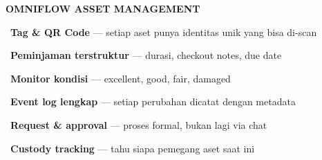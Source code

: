 \documentclass[a4paper]{article}
\begin{document}
\begin{minipage}[t]{0.485\textwidth}
    \colorbox{TealPrimary}{%
        \begin{minipage}{\dimexpr\textwidth-14pt}
            \vspace{5pt}
            {\fontsize{10}{13}\selectfont\bfseries\color{White} OMNIFLOW ASSET MANAGEMENT}
            \vspace{5pt}
        \end{minipage}}
    \vspace{6pt}

    {\fontsize{9.5}{13}\selectfont\color{TextDark}%
    \textbullet\ \textbf{Tag \& QR Code} --- setiap aset punya identitas unik yang bisa di-scan\par\vspace{4pt}%
    \textbullet\ \textbf{Peminjaman terstruktur} --- durasi, checkout notes, due date\par\vspace{4pt}%
    \textbullet\ \textbf{Monitor kondisi} --- excellent, good, fair, damaged\par\vspace{4pt}%
    \textbullet\ \textbf{Event log lengkap} --- setiap perubahan dicatat dengan metadata\par\vspace{4pt}%
    \textbullet\ \textbf{Request \& approval} --- proses formal, bukan lagi via chat\par\vspace{4pt}%
    \textbullet\ \textbf{Custody tracking} --- tahu siapa pemegang aset saat ini}%
\end{minipage}

\vspace{8pt}
\end{document}
